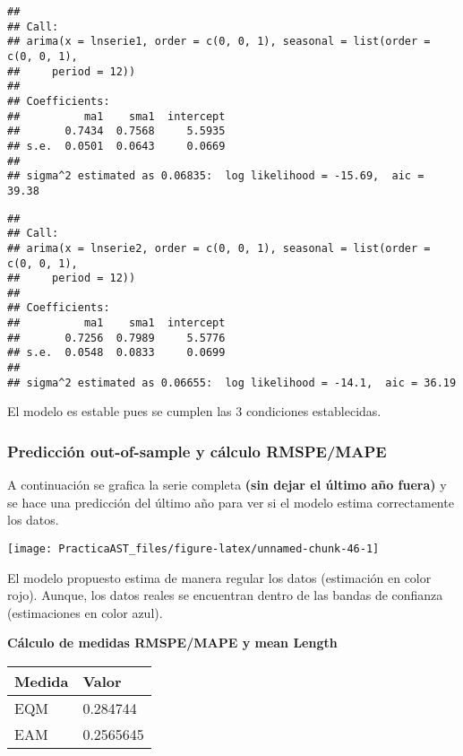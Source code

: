 \documentclass[
]{article}
\begin{document}
\begin{verbatim}
## 
## Call:
## arima(x = lnserie1, order = c(0, 0, 1), seasonal = list(order = c(0, 0, 1), 
##     period = 12))
## 
## Coefficients:
##          ma1    sma1  intercept
##       0.7434  0.7568     5.5935
## s.e.  0.0501  0.0643     0.0669
## 
## sigma^2 estimated as 0.06835:  log likelihood = -15.69,  aic = 39.38
\end{verbatim}

\begin{verbatim}
## 
## Call:
## arima(x = lnserie2, order = c(0, 0, 1), seasonal = list(order = c(0, 0, 1), 
##     period = 12))
## 
## Coefficients:
##          ma1    sma1  intercept
##       0.7256  0.7989     5.5776
## s.e.  0.0548  0.0833     0.0699
## 
## sigma^2 estimated as 0.06655:  log likelihood = -14.1,  aic = 36.19
\end{verbatim}

El modelo es estable pues se cumplen las 3 condiciones establecidas.

\medskip

\hypertarget{predicciuxf3n-out-of-sample-y-cuxe1lculo-rmspemape}{%
\subsubsection{Predicción out-of-sample y cálculo
RMSPE/MAPE}\label{predicciuxf3n-out-of-sample-y-cuxe1lculo-rmspemape}}

A continuación se grafica la serie completa \textbf{(sin dejar el último
año fuera)} y se hace una predicción del último año para ver si el
modelo estima correctamente los datos.

\begin{center}\texttt{[image: PracticaAST\_files/figure-latex/unnamed-chunk-46-1]} \end{center}

El modelo propuesto estima de manera regular los datos (estimación en
color rojo). Aunque, los datos reales se encuentran dentro de las bandas
de confianza (estimaciones en color azul).

\medskip

\textbf{Cálculo de medidas RMSPE/MAPE y mean Length}

\begin{longtable}[]{@{}ll@{}}
\toprule()
Medida & Valor \\
\midrule()
\endhead
EQM & 0.284744 \\
EAM & 0.2565645 \\
\bottomrule()
\end{longtable}
\end{document}

